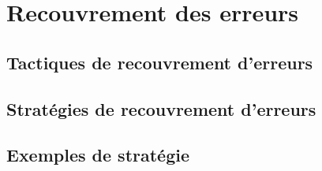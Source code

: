 \section{Recouvrement des erreurs}
\label{sec:contribution_tf_recovery}

\subsection{Tactiques de recouvrement d'erreurs}
\subsection{Stratégies de recouvrement d'erreurs}
\subsection{Exemples de stratégie}


